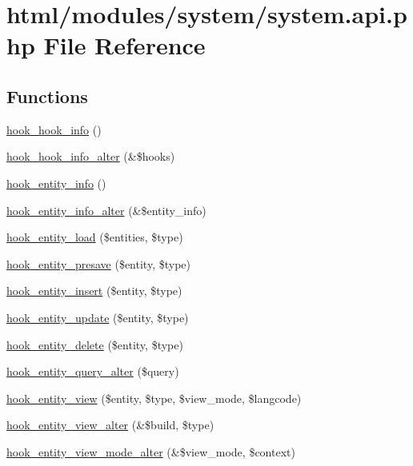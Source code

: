 \hypertarget{system_8api_8php}{
\section{html/modules/system/system.api.php File Reference}
\label{system_8api_8php}
}
\subsection*{Functions}
\begin{DoxyCompactItemize}
\item 
\hyperlink{group__hooks_ga65142e7864f445483786087d180a2010}{hook\_\-hook\_\-info} ()
\item 
\hyperlink{group__hooks_gaa02e3983f86b09fc29d5e795fd943cb1}{hook\_\-hook\_\-info\_\-alter} (\&\$hooks)
\item 
\hyperlink{group__hooks_gaf02318e9d0e8cdbf6d187b271b9969a8}{hook\_\-entity\_\-info} ()
\item 
\hyperlink{group__hooks_ga0394a72e4872603e91ce22440195ab45}{hook\_\-entity\_\-info\_\-alter} (\&\$entity\_\-info)
\item 
\hyperlink{group__hooks_ga1f594647c8cbb27f75b77cc4118da8d6}{hook\_\-entity\_\-load} (\$entities, \$type)
\item 
\hyperlink{group__hooks_ga1837f8059e89f6b0c00826f3e06e24f7}{hook\_\-entity\_\-presave} (\$entity, \$type)
\item 
\hyperlink{group__hooks_ga38882255a4252e0e87d77ecd9c75a0dd}{hook\_\-entity\_\-insert} (\$entity, \$type)
\item 
\hyperlink{group__hooks_ga4b7c83c8b2e4f3719327ae794d0964ef}{hook\_\-entity\_\-update} (\$entity, \$type)
\item 
\hyperlink{group__hooks_gac329b7f9d18e7fbccb6057e6f4bc4cb9}{hook\_\-entity\_\-delete} (\$entity, \$type)
\item 
\hyperlink{group__hooks_ga22d97ef7297e17697cdaa8b32483f412}{hook\_\-entity\_\-query\_\-alter} (\$query)
\item 
\hyperlink{group__hooks_gae273ba271c2ef1192fe135afa9da5d49}{hook\_\-entity\_\-view} (\$entity, \$type, \$view\_\-mode, \$langcode)
\item 
\hyperlink{group__hooks_ga2c2be6c70815b426f0eb13b0b68edb40}{hook\_\-entity\_\-view\_\-alter} (\&\$build, \$type)
\item 
\hyperlink{group__hooks_gaca4b0e0aba85f92344ccf941684f2272}{hook\_\-entity\_\-view\_\-mode\_\-alter} (\&\$view\_\-mode, \$context)

\end{DoxyCompactItemize}
